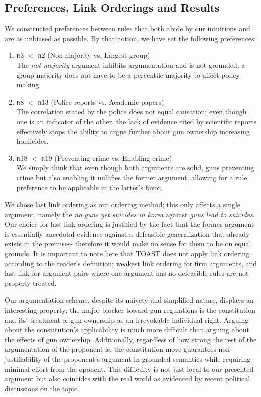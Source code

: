\documentclass[]{article}
\begin{document}
\subsection{Preferences, Link Orderings and Results}
We constructed preferences between rules that both abide by our intuitions and are as unbiased as possible. By that notion, we have set the following preferences:
\begin{enumerate}
\item \textsc{r3} $<$ \textsc{r2} (Non-majority vs. Largest group)\\
The \textit{not-majority} argument inhibits argumentation and is not grounded; a group majority does not have to be a percentile majority to affect policy making.
\item \textsc{r8} $<$ \textsc{r13} (Police reports vs. Academic papers)\\
The correlation stated by the police does not equal causation; even though one is an indicator of the other, the lack of evidence cited by scientific reports effectively stops the ability to argue further about gun ownership increasing homicides.
\item \textsc{r18} $<$ \textsc{r19} (Preventing crime vs. Enabling crime)\\
We simply think that even though both arguments are solid, guns preventing crime but also enabling it nullifies the former argument, allowing for a rule preference to be applicable in the latter's favor.
\end{enumerate}

We chose last link ordering as our ordering method; this only affects a single argument, namely the \textit{no guns yet suicides in korea} against \textit{guns lead to suicides}. Our choice for last link ordering is justified by the fact that the former argument is essentially anecdotal evidence against a defeasible generalization that already exists in the premises- therefore it would make no sense for them to be on equal grounds. It is important to note here that TOAST does not apply link ordering according to the reader's definition; weakest link ordering for firm arguments, and last link for argument pairs where one argument has no defeasible rules are not properly treated. 

Our argumentation scheme, despite its naivety and simplified nature, displays an interesting property; the major blocker toward gun regulations is the constitution and its' treatment of gun ownership as an irrevokable individual right. Arguing about the constitution's applicability is much more difficult than arguing about the effects of gun ownership. Additionally, regardless of how strong the rest of the argumentation of the proponent is, the constitution move guarantees non-justifiability of the proponent's argument in grounded semantics while requiring minimal effort from the oponent. This difficulty is not just local to our presented argument but also coincides with the real world as evidenced by recent political discussions on the topic.
\end{document}
